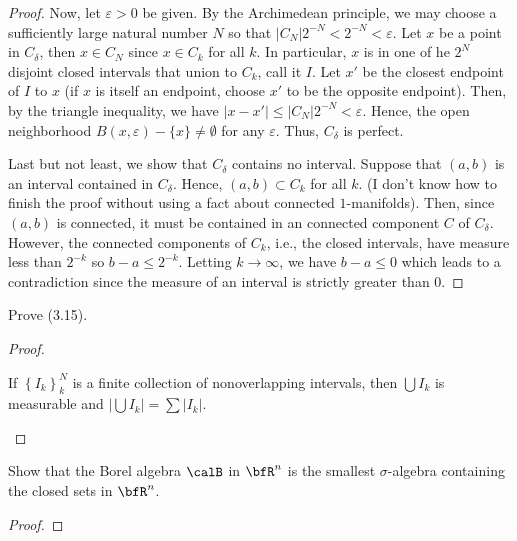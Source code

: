 \begin{proof}
Now, let $\varepsilon>0$ be given. By the Archimedean
principle, we may choose a sufficiently large natural number $N$ so that
$\left|C_N\right|2^{-N}<2^{-N}<\varepsilon$. Let $x$ be a point in
$C_\delta$, then $x\in C_N$ since $x\in C_k$ for all $k$. In particular,
$x$ is in one of he $2^N$ disjoint closed intervals that union to $C_k$,
call it $I$. Let $x'$ be the closest endpoint of $I$ to $x$ (if $x$ is
itself an endpoint, choose $x'$ to be the opposite endpoint). Then, by the
triangle inequality, we have $\left|x-x'\right|\leq
\left|C_N\right|2^{-N}<\varepsilon$. Hence, the open neighborhood
$B(x,\varepsilon)\minus\{x\}\neq\emptyset$ for any $\varepsilon$. Thus,
$C_\delta$ is perfect.

Last but not least, we show that $C_\delta$ contains no interval. Suppose
that $(a,b)$ is an interval contained in $C_\delta$. Hence, $(a,b)\subset
C_k$ for all $k$. (I don't know how to finish the proof without using a
fact about connected $1$-manifolds). Then, since $(a,b)$ is connected, it
must be contained in an connected component $C$ of $C_\delta$. However, the
connected components of $C_k$, i.e., the closed intervals, have measure
less than $2^{-k}$ so $b-a\leq 2^{-k}$. Letting $k\to\infty$, we have
$b-a\leq 0$ which leads to a contradiction since the measure of an interval
is strictly greater than $0$.
\end{proof}
\newpage

\begin{problem}
Prove (3.15).
\end{problem}
\begin{proof}
\begin{lemma*}
If $\left\{I_k\right\}_k^N$ is a finite collection of nonoverlapping
intervals, then $\bigcup I_k$ is measurable and $\left|\bigcup
  I_k\right|=\sum\left|I_k\right|$.
\end{lemma*}
\end{proof}
\newpage

\begin{problem}
Show that the Borel algebra $\calB$ in $\bfR^n$ is the smallest
$\sigma$-algebra containing the closed sets in $\bfR^n$.
\end{problem}
\begin{proof}
\end{proof}
\newpage

